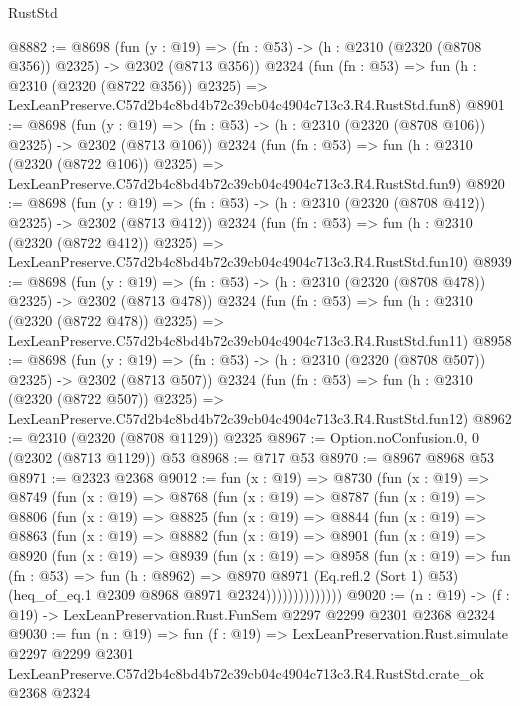 \begin{lexlean}{RustStd}
\begin{coremodule}
@8882 := @8698
    (fun (y : @19) => (fn : @53) -> (h : @2310 (@2320 (@8708 @356)) @2325) -> @2302 (@8713 @356))
    @2324
    (fun (fn : @53) =>
    fun (h : @2310 (@2320 (@8722 @356)) @2325) =>
    LexLeanPreserve.C57d2b4c8bd4b72c39cb04c4904c713c3.R4.RustStd.fun8)
@8901 := @8698
    (fun (y : @19) => (fn : @53) -> (h : @2310 (@2320 (@8708 @106)) @2325) -> @2302 (@8713 @106))
    @2324
    (fun (fn : @53) =>
    fun (h : @2310 (@2320 (@8722 @106)) @2325) =>
    LexLeanPreserve.C57d2b4c8bd4b72c39cb04c4904c713c3.R4.RustStd.fun9)
@8920 := @8698
    (fun (y : @19) => (fn : @53) -> (h : @2310 (@2320 (@8708 @412)) @2325) -> @2302 (@8713 @412))
    @2324
    (fun (fn : @53) =>
    fun (h : @2310 (@2320 (@8722 @412)) @2325) =>
    LexLeanPreserve.C57d2b4c8bd4b72c39cb04c4904c713c3.R4.RustStd.fun10)
@8939 := @8698
    (fun (y : @19) => (fn : @53) -> (h : @2310 (@2320 (@8708 @478)) @2325) -> @2302 (@8713 @478))
    @2324
    (fun (fn : @53) =>
    fun (h : @2310 (@2320 (@8722 @478)) @2325) =>
    LexLeanPreserve.C57d2b4c8bd4b72c39cb04c4904c713c3.R4.RustStd.fun11)
@8958 := @8698
    (fun (y : @19) => (fn : @53) -> (h : @2310 (@2320 (@8708 @507)) @2325) -> @2302 (@8713 @507))
    @2324
    (fun (fn : @53) =>
    fun (h : @2310 (@2320 (@8722 @507)) @2325) =>
    LexLeanPreserve.C57d2b4c8bd4b72c39cb04c4904c713c3.R4.RustStd.fun12)
@8962 := @2310 (@2320 (@8708 @1129)) @2325
@8967 := Option.noConfusion.{0, 0} (@2302 (@8713 @1129)) @53
@8968 := @717 @53
@8970 := @8967 @8968 @53
@8971 := @2323 @2368
@9012 := fun (x : @19) =>
  @8730
    (fun (x : @19) =>
    @8749
      (fun (x : @19) =>
      @8768
        (fun (x : @19) =>
        @8787
          (fun (x : @19) =>
          @8806
            (fun (x : @19) =>
            @8825
              (fun (x : @19) =>
              @8844
                (fun (x : @19) =>
                @8863
                  (fun (x : @19) =>
                  @8882
                    (fun (x : @19) =>
                    @8901
                      (fun (x : @19) =>
                      @8920
                        (fun (x : @19) =>
                        @8939
                          (fun (x : @19) =>
                          @8958
                            (fun (x : @19) =>
                            fun (fn : @53) =>
                            fun (h : @8962) =>
                            @8970
                              @8971
                              (Eq.refl.{2} (Sort 1) @53)
                              (heq_of_eq.{1} @2309 @8968 @8971 @2324))))))))))))))
@9020 := (n : @19) -> (f : @19) -> LexLeanPreservation.Rust.FunSem @2297 @2299 @2301 @2368 @2324
@9030 := fun (n : @19) =>
  fun (f : @19) =>
  LexLeanPreservation.Rust.simulate
    @2297
    @2299
    @2301
    LexLeanPreserve.C57d2b4c8bd4b72c39cb04c4904c713c3.R4.RustStd.crate_ok
    @2368
    @2324
\end{coremodule}
\end{lexlean}
